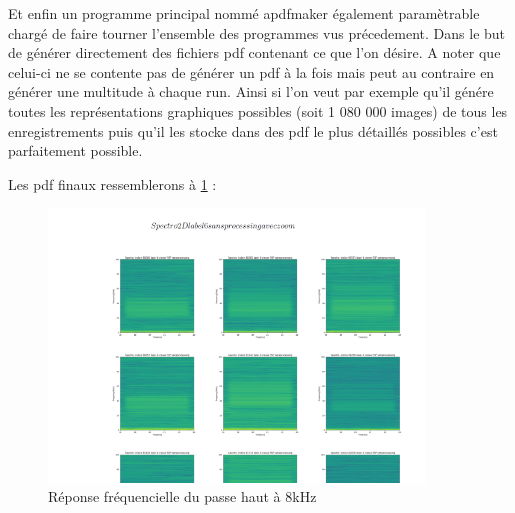 Et enfin un programme principal nommé apdfmaker également paramètrable chargé de faire tourner l'ensemble des programmes vus précedement. Dans le but de générer directement des fichiers pdf contenant ce que l'on désire. A noter que celui-ci ne se contente pas de générer un pdf à la fois mais peut au contraire en générer une multitude à chaque run. Ainsi si l'on veut par exemple qu'il génére toutes les représentations graphiques possibles (soit 1 080 000 images) de tous les enregistrements puis qu'il les stocke dans des pdf le plus détaillés possibles c'est parfaitement possible.

Les pdf finaux ressemblerons à \ref{fig:exempledepdf} :

\begin{figure}[!h]
\centering
\includegraphics[width=10cm]{./images/pdfexemple.png}
\caption{Réponse fréquencielle du passe haut à 8kHz%
\label{fig:exempledepdf}}
\end{figure}
